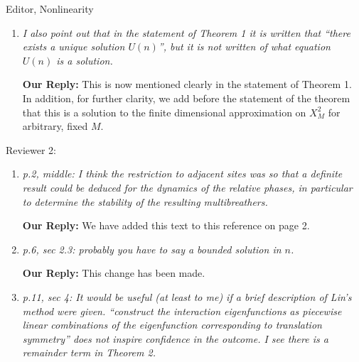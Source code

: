 \documentclass[11pt]{letter}
\begin{document}
\begin{letter}{Editor, Nonlinearity}
\begin{enumerate}
{\bf Our Reply:}    We thank the reviewer for this important observation and
suggestion. The approximation used is now made  clearer in the abstract, as well as on page 5, where we say (at the recommendation of the reviewer) that the accuracy of this approximation is a topic worth further investigating, and mention the potential effect of the truncation on resonances. In addition, we reference Figure 4 on page 5, and added Figure 4b to show the exponential decay in $L^2$ norm of the Fourier truncations. Finally, we clarify in the theorems that these solutions and eigenvalues are for the problem on the truncated space $X_M^2$. In addition, we note before the statement of each theorem that the result applies to the finite dimensional approximation on $X_{M}^2$ for arbitrary, fixed $M$.
    \vspace{4mm}

    \item \emph{I also point out that in the statement of Theorem 1 it is written that ``there exists a unique solution $U(n)$'', but it is not written of what equation $U(n)$ is a solution.} 
    
    
 {\bf Our Reply:}      This is now mentioned clearly in the statement of Theorem 1. In addition, for further clarity, we add before the statement of the theorem that this is a solution to the finite dimensional approximation on $X_{M}^2$ for arbitrary, fixed $M$.
\end{enumerate}

Reviewer 2:
\begin{enumerate}
    \item \emph{p.2, middle: I think the restriction to adjacent sites was so that a definite result could be deduced for the dynamics of the relative phases, in particular to determine the stability of the resulting multibreathers.} 
    
    
 {\bf Our Reply:}     We have added this text to this reference on page 2.
    \vspace{4mm}

    \item \emph{p.6, sec 2.3: probably you have to say a bounded solution in $n$.} 
    
     {\bf Our Reply:}  This change has been made.
    \vspace{4mm}

    \item \emph{p.11, sec 4: It would be useful (at least to me) if a brief description of Lin’s method were given. ``construct the interaction eigenfunctions as piecewise linear combinations of the eigenfunction corresponding to translation symmetry'' does not inspire confidence in the outcome. I see there is a remainder term in Theorem 2.} 


\end{enumerate}
\end{letter}
\end{document}
